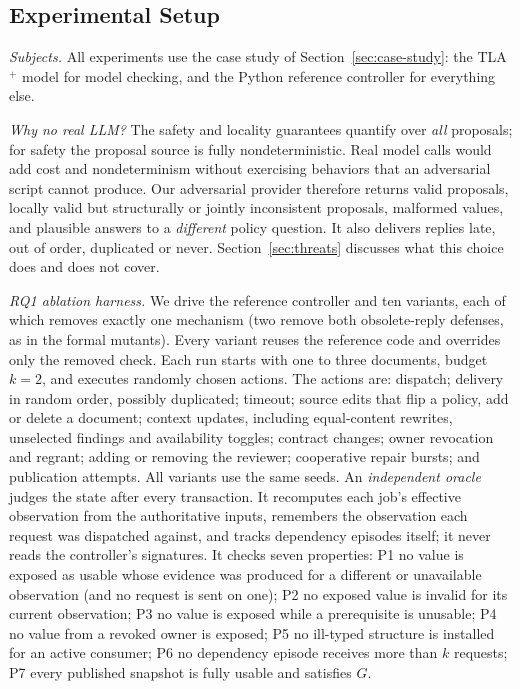 \documentclass[10pt,journal,compsoc]{IEEEtran}
\theoremstyle{plain}
\theoremstyle{definition}
\begin{document}
\subsection{Experimental Setup}
\emph{Subjects.} All experiments use the case study of Section~\ref{sec:case-study}: the TLA$^+$ model for model checking, and the Python reference controller for everything else.

\emph{Why no real LLM?} The safety and locality guarantees quantify over \emph{all} proposals; for safety the proposal source is fully nondeterministic. Real model calls would add cost and nondeterminism without exercising behaviors that an adversarial script cannot produce. Our adversarial provider therefore returns valid proposals, locally valid but structurally or jointly inconsistent proposals, malformed values, and plausible answers to a \emph{different} policy question. It also delivers replies late, out of order, duplicated or never. Section~\ref{sec:threats} discusses what this choice does and does not cover.

\emph{RQ1 ablation harness.} We drive the reference controller and ten variants, each of which removes exactly one mechanism (two remove both obsolete-reply defenses, as in the formal mutants). Every variant reuses the reference code and overrides only the removed check. Each run starts with one to three documents, budget $k=2$, and executes \AblSteps{} randomly chosen actions. The actions are: dispatch; delivery in random order, possibly duplicated; timeout; source edits that flip a policy, add or delete a document; context updates, including equal-content rewrites, unselected findings and availability toggles; contract changes; owner revocation and regrant; adding or removing the reviewer; cooperative repair bursts; and publication attempts. All variants use the same \AblRuns{} seeds. An \emph{independent oracle} judges the state after every transaction. It recomputes each job's effective observation from the authoritative inputs, remembers the observation each request was dispatched against, and tracks dependency episodes itself; it never reads the controller's signatures. It checks seven properties:
P1 no value is exposed as usable whose evidence was produced for a different or unavailable observation (and no request is sent on one);
P2 no exposed value is invalid for its current observation;
P3 no value is exposed while a prerequisite is unusable;
P4 no value from a revoked owner is exposed;
P5 no ill-typed structure is installed for an active consumer;
P6 no dependency episode receives more than $k$ requests;
P7 every published snapshot is fully usable and satisfies $G$.
\end{document}
